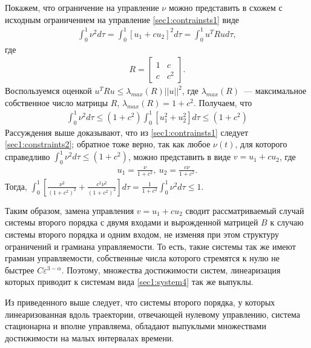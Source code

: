 \documentclass[../main.tex]{subfiles}
\begin{document}
 
Покажем, что ограничение на управление $ \nu $  можно представить в схожем с исходным ограничением на управление \eqref{sec1:contrainsts1} виде
\begin{gather*}
    \int_{0}^{1} \nu ^2 d \tau  = \int_{0}^{1} \left[ u_1 + c u_2 \right]^2 d \tau =  \int_{0}^{1} u^T  R u d \tau,
\end{gather*}
где 
\begin{gather*}
     R = \left[ \begin{array}{cc}
         1 & c \\ 
         c & c^2
     \end{array} \right].
\end{gather*}
Воспользуемся оценкой $
u^T R u \leq \lambda_{max}(R) || u ||^2 $, где $ \lambda_{max}(R) $~--- максимальное собственное число матрицы $ R $, $ \lambda_{max}(R)  = 1 + c^2 $.
Получаем, что
\begin{gather}\label{sec1:constraints2}
    \int_{0}^{1} \nu ^2 d \tau \leq (1 + c^2) \int_{0}^{1} \left[ u_1^2 + u_2^2 \right] d \tau \leq (1 + c^2)
\end{gather}
Рассуждения выше доказывают, что из \eqref{sec1:contrainsts1} следует \eqref{sec1:constraints2}; обратное тоже верно, так как любое $ \nu(t) $, для которого справедливо $ \int_{0}^{1} \nu ^2 d \tau \leq (1 + c^2) $, можно представить в виде $ v = u_1 + c u_2 $, где 
\begin{gather*}
    u_1 = \frac{\nu}{1+c^2}, \ u_2 = \frac{c \nu}{1+c^2}.
\end{gather*}
Тогда, $ \int_0^1 \left[ \frac{\nu^2}{(1+c^2)^2} + \frac{c^2 \nu^2}{(1+c^2)^2}\right] d \tau = \frac{1}{1+c^2} \int_{0}^{1} \nu ^2 d \tau  \leq 1 $. 
 
Таким образом, замена управления $ v = u_1 + c u_2 $ сводит рассматриваемый случай системы второго порядка с двумя входами и вырожденной матрицей $ B $ к случаю системы второго порядка и одним входом, не изменяя при этом структуру ограничений и грамиана управляемости.
То есть, такие системы так же имеют грамиан управляемости, собственные числа которого стремятся к нулю не быстрее $ C \varepsilon^{3-\alpha} $.
Поэтому, множества достижимости систем, линеаризация которых приводит к системам вида \eqref{sec1:system4} так же выпуклы.
 
Из приведенного выше следует, что системы второго порядка, у которых линеаризованная вдоль траектории, отвечающей нулевому управлению, система стационарна и вполне управляема,  обладают выпуклыми множествами достижимости на малых интервалах времени.
\end{document}
